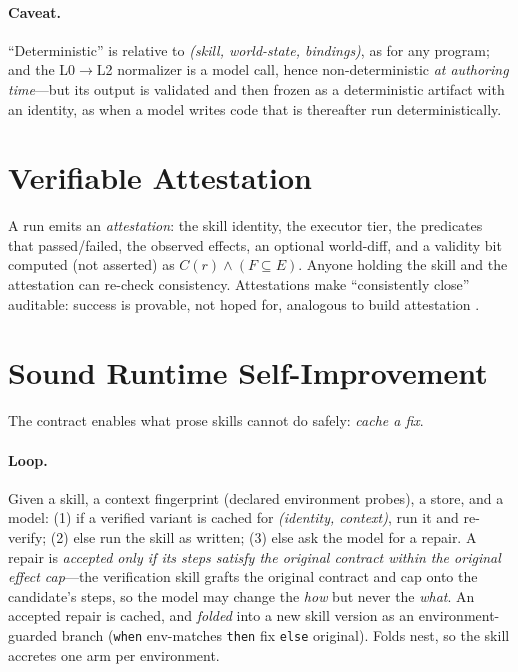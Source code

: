\documentclass[11pt]{article}
\begin{document}
\paragraph{Caveat.} ``Deterministic'' is relative to \emph{(skill, world-state,
bindings)}, as for any program; and the L0$\to$L2 normalizer is a model call,
hence non-deterministic \emph{at authoring time}---but its output is validated and
then frozen as a deterministic artifact with an identity, as when a model writes
code that is thereafter run deterministically.

\section{Verifiable Attestation}\label{sec:attest}

A run emits an \emph{attestation}: the skill identity, the executor tier, the
predicates that passed/failed, the observed effects, an optional world-diff, and
a validity bit computed (not asserted) as $C(r)\wedge(F\subseteq E)$. Anyone
holding the skill and the attestation can re-check consistency. Attestations make
``consistently close'' auditable: success is provable, not hoped for, analogous
to build attestation \cite{intoto}.

\section{Sound Runtime Self-Improvement}\label{sec:heal}

The contract enables what prose skills cannot do safely: \emph{cache a fix}.

\paragraph{Loop.} Given a skill, a context fingerprint (declared environment
probes), a store, and a model:
(1) if a verified variant is cached for \emph{(identity, context)}, run it and
re-verify; (2) else run the skill as written; (3) else ask the model for a
repair. A repair is \emph{accepted only if its steps satisfy the original
contract within the original effect cap}---the verification skill grafts the
original contract and cap onto the candidate's steps, so the model may change the
\emph{how} but never the \emph{what}. An accepted repair is cached, and
\emph{folded} into a new skill version as an environment-guarded branch
(\texttt{when} env-matches \texttt{then} fix \texttt{else} original). Folds nest,
so the skill accretes one arm per environment.
\end{document}

